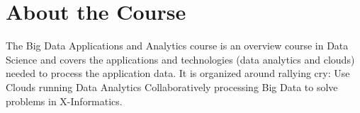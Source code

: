 \FILENAME

\section{About the Course}\label{about-the-course}

The Big Data Applications and Analytics course is an overview course in
Data Science and covers the applications and technologies (data
analytics and clouds) needed to process the application data. It is
organized around rallying cry: Use Clouds running Data Analytics
Collaboratively processing Big Data to solve problems in X-Informatics.
